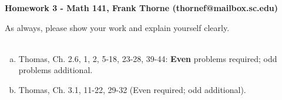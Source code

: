 \documentclass[12pt]{article}
\begin{document}
\setlength{\topmargin}{-2mm}





\begin{center}{\bf Homework 3 - Math 141, Frank Thorne (thornef@mailbox.sc.edu)}
\end{center}

As always, please show your work and explain yourself clearly. 
\\
\\
\begin{enumerate}[(a)]

\item
Thomas, Ch. 2.6, 1, 2, 5-18, 23-28, 39-44: {\bf Even} problems required;
odd problems additional.

\item
Thomas, Ch. 3.1, 11-22, 29-32 (Even required; odd additional).
\end{enumerate}
\end{document}
